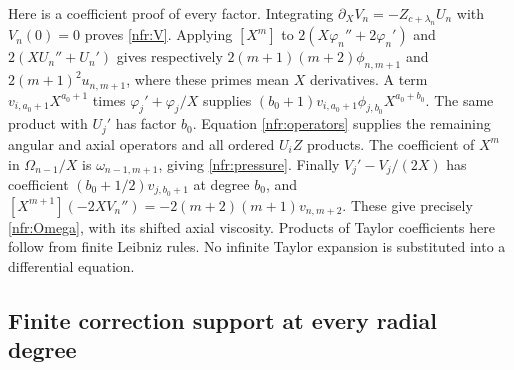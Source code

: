 Here is a coefficient proof of every factor. Integrating
\(\partial_XV_n=-Z_{c+\lambda_n}U_n\) with \(V_n(0)=0\)
proves \eqref{nfr:V}. Applying \([X^m]\) to
\(2(X\varphi_n''+2\varphi_n')\) and \(2(XU_n''+U_n')\)
gives respectively \(2(m+1)(m+2)\phi_{n,m+1}\) and
\(2(m+1)^2u_{n,m+1}\), where these primes mean \(X\)
derivatives. A term \(v_{i,a_0+1}X^{a_0+1}\) times
\(\varphi_j'+\varphi_j/X\) supplies
\((b_0+1)v_{i,a_0+1}\phi_{j,b_0}X^{a_0+b_0}\).
The same product with \(U_j'\) has factor \(b_0\).
Equation \eqref{nfr:operators} supplies the remaining angular and axial
operators and all ordered \(U_iZ\) products. The coefficient of
\(X^m\) in \(\Omega_{n-1}/X\) is \(\omega_{n-1,m+1}\),
giving \eqref{nfr:pressure}. Finally
\(V_j'-V_j/(2X)\) has coefficient
\((b_0+1/2)v_{j,b_0+1}\) at degree \(b_0\), and
\([X^{m+1}](-2XV_n'')=-2(m+2)(m+1)v_{n,m+2}\).
These give precisely \eqref{nfr:Omega}, with its shifted axial viscosity.
Products of Taylor coefficients here follow from finite Leibniz rules.
No infinite Taylor expansion is substituted into a differential equation.

\subsection{Finite correction support at every radial degree}

